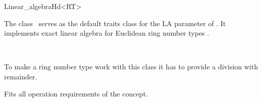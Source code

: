 \ccAutoIndexingOff
\begin{ccRefClass}{Linear_algebraHd<RT>}
\ccAutoIndexingOn
{}

\ccDefinition

The class \ccRefName\ serves as the default traits class for the LA
parameter of .  It implements exact
linear algebra for Euclidean ring number types .


\ccIsModel

%
 \\

\ccCreation
{}  %


To make a ring number type  work with this class it has to
provide a division  with remainder.

\ccOperations

Fits all operation requirements of the concept.

\ccIndexTraitsClassEnd
\ccAutoIndexingOff
\end{ccRefClass}
\ccAutoIndexingOn     